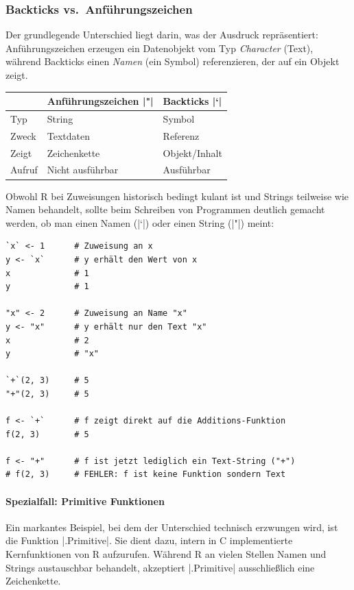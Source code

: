 \documentclass[10pt,twocolumn]{scrartcl}
\renewcommand{\lstinline}{\mycoloredinline}
\begin{document}
\subsubsection{Backticks vs.\ Anführungszeichen}

Der grundlegende Unterschied liegt darin, was der Ausdruck repräsentiert: Anführungszeichen erzeugen ein Datenobjekt vom Typ \emph{Character} (Text), während Backticks einen \emph{Namen} (ein Symbol) referenzieren, der auf ein Objekt zeigt.

\begin{tabular}{lll}
  \hline
  & Anführungszeichen \lstinline|"| & Backticks \lstinline|`| \\
  \hline
  Typ    & String            & Symbol          \\
  Zweck  & Textdaten         & Referenz        \\
  Zeigt  & Zeichenkette      & Objekt/Inhalt   \\
  Aufruf & Nicht ausführbar  & Ausführbar      \\
  \hline
\end{tabular}

Obwohl R bei Zuweisungen historisch bedingt kulant ist und Strings teilweise wie Namen behandelt, sollte beim Schreiben von Programmen deutlich gemacht werden, ob man einen Namen (\lstinline|`|) oder einen String (\lstinline|"|) meint:

\begin{lstlisting}
`x` <- 1      # Zuweisung an x
y <- `x`      # y erhält den Wert von x
x             # 1
y             # 1

"x" <- 2      # Zuweisung an Name "x"
y <- "x"      # y erhält nur den Text "x"
x             # 2
y             # "x"

`+`(2, 3)     # 5
"+"(2, 3)     # 5

f <- `+`      # f zeigt direkt auf die Additions-Funktion
f(2, 3)       # 5

f <- "+"      # f ist jetzt lediglich ein Text-String ("+")
# f(2, 3)     # FEHLER: f ist keine Funktion sondern Text
\end{lstlisting}

\paragraph{Spezialfall: Primitive Funktionen}

Ein markantes Beispiel, bei dem der Unterschied technisch erzwungen wird, ist die Funktion \lstinline|.Primitive|. Sie dient dazu, intern in C implementierte Kernfunktionen von R aufzurufen. Während R an vielen Stellen Namen und Strings austauschbar behandelt, akzeptiert \lstinline|.Primitive| ausschließlich eine Zeichenkette.
\end{document}

